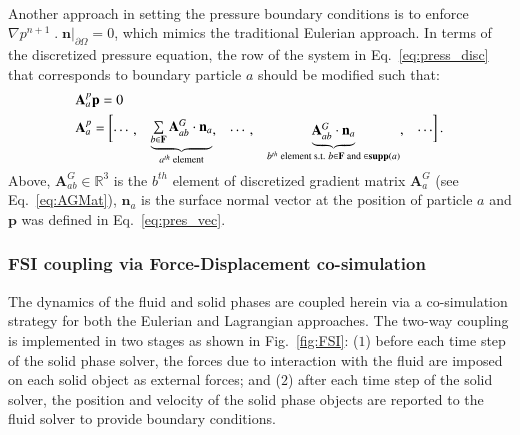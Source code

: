 \documentclass[final,3p,times]{elsarticle}
\begin{document}
\\
Another approach in setting the pressure boundary conditions is to enforce $\nabla p^{n+1}\;.\;\mathbf{n}|_{\partial \Omega}=0$, which mimics the traditional Eulerian approach. In terms of the discretized pressure equation, the row of the system in Eq.~\eqref{eq:press_disc} that corresponds to boundary particle $a$ should be modified such that:
\begin{align}\renewcommand{\arraystretch}{1.2}
&\mathbf{A}^{p}_a \mathbf{p}=  0  \\
&\mathbf{A}^{p}_a= \begin{bmatrix}
\cdots, & 
\smash[b]{\underbrace{\begin{matrix}{\sum\limits_{b \in \mathbf{F}} \mathbf{A}^G_{ab} \cdot \mathbf{n}_a } \end{matrix}}_{a^{th}\text{ element}}} ,
&\cdots, &\smash[b]{\underbrace{\begin{matrix} \mathbf{A}^G_{ab} \cdot \mathbf{n}_a \end{matrix}}_{b^{th}\text{ element s.t. }{b \in \mathbf{F} \text{ and } \in \support{a}} }}, & \cdots
\end{bmatrix}.
\end{align}\\
Above, $\mathbf{A}^G_{ab} \in {\mathbb{R}}^3$ is the $b^{th}$ element of discretized gradient matrix $\mathbf{A}^G_a$ (see Eq.~\eqref{eq:AGMat}), $\mathbf{n}_a$ is the surface normal vector at the position of particle $a$ and $\mathbf{p}$ was defined in Eq.~\eqref{eq:pres_vec}. 


\subsubsection{FSI coupling via Force-Displacement co-simulation}\label{sec:FSI}
The dynamics of the fluid and solid phases are coupled herein via a co-simulation strategy for both the Eulerian and Lagrangian approaches. The two-way coupling is implemented in two stages as shown in Fig.~\ref{fig:FSI}: ($1$) before each time step of the solid phase solver, the forces due to interaction with the fluid are imposed on each solid object as external forces; and ($2$) after each time step of the solid solver, the position and velocity of the solid phase objects are reported to the fluid solver to provide boundary conditions. 
\end{document}
